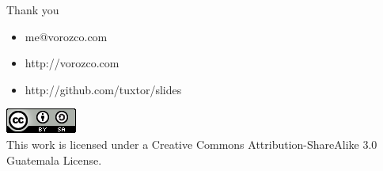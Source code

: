 \documentclass{beamer}
\begin{document}
\begin{frame}{Thank you}
\begin{itemize}
\item me@vorozco.com
\item http://vorozco.com
\item http://github.com/tuxtor/slides
\end{itemize}
\begin{center}
\includegraphics[width=0.1\linewidth]{Images/cclogo}
\\
This work is licensed under a Creative Commons Attribution-ShareAlike 3.0 Guatemala License.
\end{center}
\end{frame}
\end{document}
